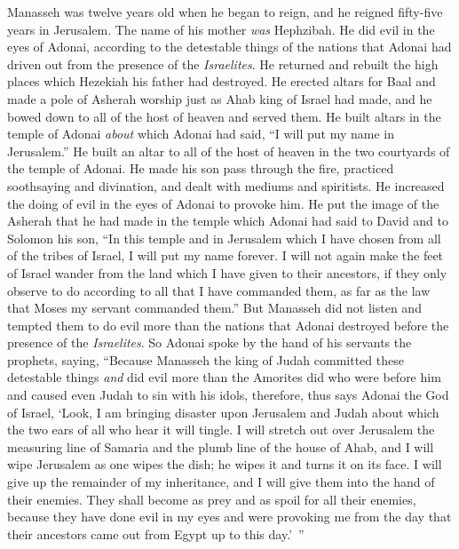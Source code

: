 \begin{biblechapter} %
 Manasseh was twelve years old when he began to reign, and he reigned fifty-five years in Jerusalem. The name of his mother \textit{was} Hephzibah.
\verse He did evil in the eyes of Adonai, according to the detestable things of the nations that Adonai had driven out from the presence of the \textit{Israelites}.
\verse He returned and rebuilt the high places which Hezekiah his father had destroyed. He erected altars for Baal and made a pole of Asherah worship just as Ahab king of Israel had made, and he bowed down to all of the host of heaven and served them.
\verse He built altars in the temple of Adonai \textit{about} which Adonai had said, “I will put my name in Jerusalem.”
\verse He built an altar to all of the host of heaven in the two courtyards of the temple of Adonai.
\verse He made his son pass through the fire, practiced soothsaying and divination, and dealt with mediums and spiritists. He increased the doing of evil in the eyes of Adonai to provoke him.
\verse He put the image of the Asherah that he had made in the temple which Adonai had said to David and to Solomon his son, “In this temple and in Jerusalem which I have chosen from all of the tribes of Israel, I will put my name forever.
\verse I will not again make the feet of Israel wander from the land which I have given to their ancestors, if they only observe to do according to all that I have commanded them, as far as the law that Moses my servant commanded them.”
\verse But Manasseh did not listen and tempted them to do evil more than the nations that Adonai destroyed before the presence of the \textit{Israelites}.
 So Adonai spoke by the hand of his servants the prophets, saying,
\verse “Because Manasseh the king of Judah committed these detestable things \textit{and} did evil more than the Amorites did who were before him and caused even Judah to sin with his idols,
\verse therefore, thus says Adonai the God of Israel, ‘Look, I am bringing disaster upon Jerusalem and Judah about which the two ears of all who hear it will tingle.
\verse I will stretch out over Jerusalem the measuring line of Samaria and the plumb line of the house of Ahab, and I will wipe Jerusalem as one wipes the dish; he wipes it and turns it on its face.
\verse I will give up the remainder of my inheritance, and I will give them into the hand of their enemies. They shall become as prey and as spoil for all their enemies,
\verse because they have done evil in my eyes and were provoking me from the day that their ancestors came out from Egypt up to this day.’ ”

\end{biblechapter}

